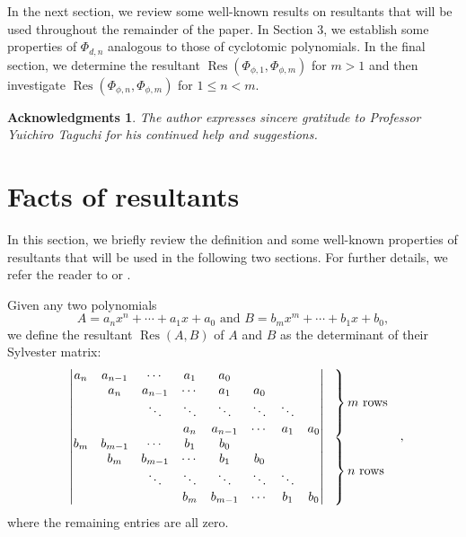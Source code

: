 \documentclass[10pt,leqno]{amsart}
\newtheorem*{acknowledgments*}{Acknowledgments}
\theoremstyle{definition}
\theoremstyle{remark}
\numberwithin{equation}{section}
\newcommand{\res}{\operatorname{Res}}
\begin{document}
In the next section, we review some well-known results on resultants that will be used throughout the remainder of the paper. In Section 3, we establish some properties of $\Phi_{d,n}$ analogous to those of cyclotomic polynomials. In the final section, we determine the resultant $\res(\Phi_{\phi,1},\Phi_{\phi,m})$ for $m>1$ and then investigate $\res(\Phi_{\phi,n},\Phi_{\phi,m})$ for $1\leq n<m$.

\begin{acknowledgments*}
    The author expresses sincere gratitude to Professor Yuichiro Taguchi for his continued help and suggestions.
\end{acknowledgments*}




\section{Facts of resultants}

In this section, we briefly review the definition and some well-known properties of resultants that will be used in the following two sections. For further details, we refer the reader to \cite[Chapter 12]{Gelfand94} or \cite[\textup{Chapter 5}]{Waerden70}.

Given any two polynomials 
$$A = a_nx^n+\cdots+a_1x+a_0\text{ and }B = b_mx^m+\cdots+b_1x+b_0,$$
we define the resultant $\res(A,B)$ of $A$ and $B$ as the determinant of their Sylvester matrix:
$$\begin{array}{c@{\hspace{0.2em}}l}
    \begin{vmatrix}
        a_n & a_{n-1} & \cdots  & a_1    & a_0     &        &        &     \\
            & a_n     & a_{n-1} & \cdots & a_1     & a_0    &        &     \\
            &         & \ddots  & \ddots & \ddots  & \ddots & \ddots &     \\
            &         &         & a_n    & a_{n-1} & \cdots & a_1    & a_0 \\
        b_m & b_{m-1} & \cdots  & b_1    & b_0     &        &        &     \\
            & b_m     & b_{m-1} & \cdots & b_1     & b_0    &        &     \\
            &         & \ddots  & \ddots & \ddots  & \ddots & \ddots &     \\
            &         &         & b_m    & b_{m-1} & \cdots & b_1    & b_0
    \end{vmatrix} & 
    \begin{array}{l}
        \left. \rule{0pt}{7ex} \right\} m \text{ rows} \\[3.5ex]
        \left. \rule{0pt}{7ex} \right\} n \text{ rows}
    \end{array}
\end{array},$$
where the remaining entries are all zero.
\end{document}
